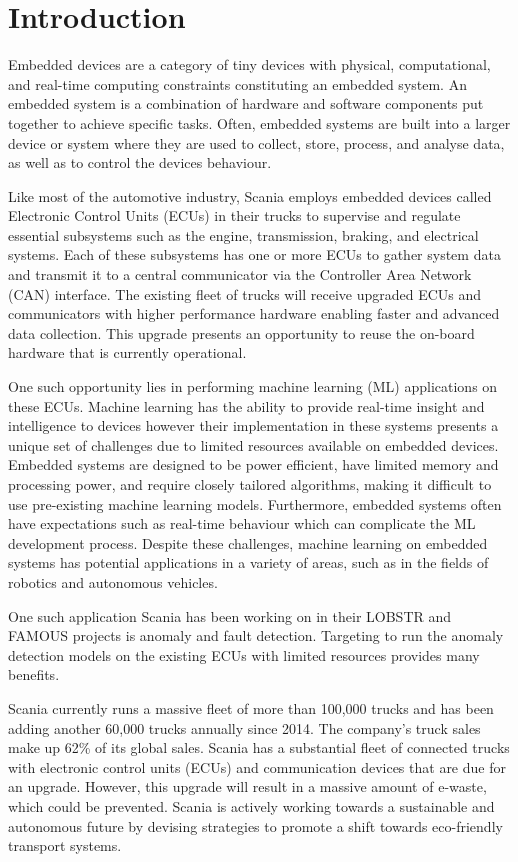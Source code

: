\part{Introduction}

Embedded devices are a category of tiny devices with physical, computational, and real-time computing constraints constituting an embedded system. An embedded system is a combination of hardware and software components put together to achieve specific tasks. Often, embedded systems are built into a larger device or system where they are used to collect, store, process, and analyse data, as well as to control the device\textquotesingle s behaviour.

Like most of the automotive industry, Scania employs embedded devices called Electronic Control Units (ECUs) in their trucks to supervise and regulate essential subsystems such as the engine, transmission, braking, and electrical systems. Each of these subsystems has one or more ECUs to gather system data and transmit it to a central communicator via the Controller Area Network (CAN) interface. The existing fleet of trucks will receive upgraded ECUs and communicators with higher performance hardware enabling faster and advanced data collection. This upgrade presents an opportunity to reuse the on-board hardware that is currently operational.

One such opportunity lies in performing machine learning (ML) applications on these ECUs. Machine learning has the ability to provide real-time insight and intelligence to devices however their implementation in these systems presents a unique set of challenges due to limited resources available on embedded devices. Embedded systems are designed to be power efficient, have limited memory and processing power, and require closely tailored algorithms, making it difficult to use pre-existing machine learning models. Furthermore, embedded systems often have expectations such as real-time behaviour which can complicate the ML development process. Despite these challenges, machine learning on embedded systems has potential applications in a variety of areas, such as in the fields of robotics and autonomous vehicles.

One such application Scania has been working on in their \textsc{LOBSTR} \cite{lobstr} and \textsc{FAMOUS} projects is anomaly and fault detection. Targeting to run the anomaly detection models on the existing ECUs with limited resources provides many benefits.

Scania currently runs a massive fleet of more than 100,000 trucks and has been adding another 60,000 trucks annually since 2014. The company's truck sales make up 62\% of its global sales. Scania has a substantial fleet of connected trucks with electronic control units (ECUs) and communication devices that are due for an upgrade. However, this upgrade will result in a massive amount of e-waste, which could be prevented. Scania is actively working towards a sustainable and autonomous future by devising strategies to promote a shift towards eco-friendly transport systems.

